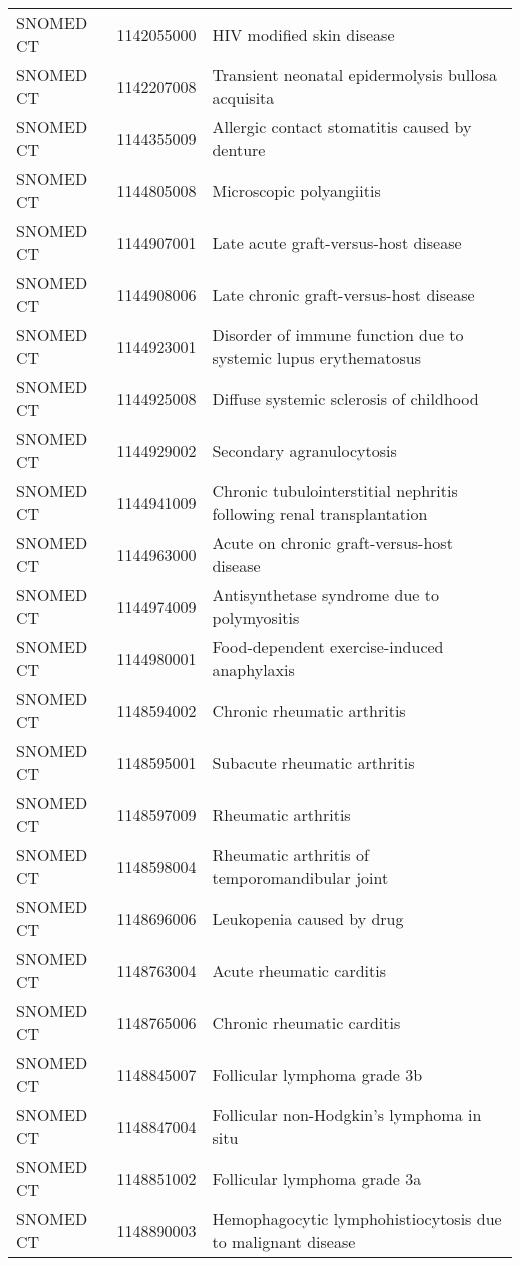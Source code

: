 \begin{longtable}{p{}p{}p{}}
  SNOMED CT & 1142055000 & HIV modified skin disease \\ 
  SNOMED CT & 1142207008 & Transient neonatal epidermolysis bullosa acquisita \\ 
  SNOMED CT & 1144355009 & Allergic contact stomatitis caused by denture \\ 
  SNOMED CT & 1144805008 & Microscopic polyangiitis \\ 
  SNOMED CT & 1144907001 & Late acute graft-versus-host disease \\ 
  SNOMED CT & 1144908006 & Late chronic graft-versus-host disease \\ 
  SNOMED CT & 1144923001 & Disorder of immune function due to systemic lupus erythematosus \\ 
  SNOMED CT & 1144925008 & Diffuse systemic sclerosis of childhood \\ 
  SNOMED CT & 1144929002 & Secondary agranulocytosis \\ 
  SNOMED CT & 1144941009 & Chronic tubulointerstitial nephritis following renal transplantation \\ 
  SNOMED CT & 1144963000 & Acute on chronic graft-versus-host disease \\ 
  SNOMED CT & 1144974009 & Antisynthetase syndrome due to polymyositis \\ 
  SNOMED CT & 1144980001 & Food-dependent exercise-induced anaphylaxis \\ 
  SNOMED CT & 1148594002 & Chronic rheumatic arthritis \\ 
  SNOMED CT & 1148595001 & Subacute rheumatic arthritis \\ 
  SNOMED CT & 1148597009 & Rheumatic arthritis \\ 
  SNOMED CT & 1148598004 & Rheumatic arthritis of temporomandibular joint \\ 
  SNOMED CT & 1148696006 & Leukopenia caused by drug \\ 
  SNOMED CT & 1148763004 & Acute rheumatic carditis \\ 
  SNOMED CT & 1148765006 & Chronic rheumatic carditis \\ 
  SNOMED CT & 1148845007 & Follicular lymphoma grade 3b \\ 
  SNOMED CT & 1148847004 & Follicular non-Hodgkin's lymphoma in situ \\ 
  SNOMED CT & 1148851002 & Follicular lymphoma grade 3a \\ 
  SNOMED CT & 1148890003 & Hemophagocytic lymphohistiocytosis due to malignant disease \\ 

\end{longtable}
